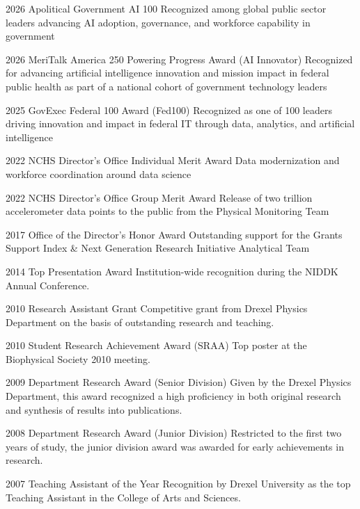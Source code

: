 \documentclass[]{scrartcl}
\begin{document}
\begin{cleanCV}



\WorkExperienceX
{2026}
{Apolitical Government AI 100}
{Recognized among global public sector leaders advancing AI adoption, governance, and workforce capability in government}

\WorkExperienceX
{2026}
{MeriTalk America 250 Powering Progress Award (AI Innovator)}
{Recognized for advancing artificial intelligence innovation and mission impact in federal public health as part of a national cohort of government technology leaders}

\WorkExperienceX
{2025}
{GovExec Federal 100 Award (Fed100)}
{Recognized as one of 100 leaders driving innovation and impact in federal IT through data, analytics, and artificial intelligence}

\WorkExperienceX
{2022}
{NCHS Director's Office Individual Merit Award}
{Data modernization and workforce coordination around data science}

\WorkExperienceX
{2022}
{NCHS Director's Office Group Merit Award}
{Release of two trillion accelerometer data points to the public from the Physical Monitoring Team}

\WorkExperienceX
{2017}
{Office of the Director's Honor Award}
{Outstanding support for the Grants Support Index \& Next Generation Research Initiative Analytical Team}

\WorkExperienceX
{2014}
{Top Presentation Award}
{Institution-wide recognition during the NIDDK Annual Conference.}

\WorkExperienceX
{2010}
{Research Assistant Grant}
{Competitive grant from Drexel Physics Department on the basis of outstanding research and teaching.}

\WorkExperienceX
{2010}
{Student Research Achievement Award (SRAA)}
{Top poster at the Biophysical Society 2010 meeting. }

\WorkExperienceX
{2009}
{Department Research Award (Senior Division)}
{Given by the Drexel Physics Department, this award recognized a high proficiency in both original research and synthesis of results into publications.}

\WorkExperienceX
{2008}
{Department Research Award (Junior Division)}
{Restricted to the first two years of study, the junior division award was awarded for early achievements in research.}

\WorkExperienceX
{2007}
{Teaching Assistant of the Year}
{Recognition by Drexel University as the top Teaching Assistant in the College of Arts and Sciences.}


\end{cleanCV}
\end{document}
